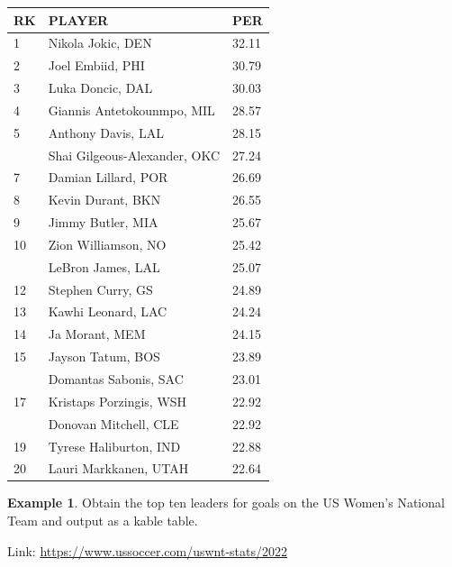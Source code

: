 \documentclass[
  11pt,
]{book}
\newenvironment{Shaded}{\begin{snugshade}}{\end{snugshade}}
\newcommand{\DecValTok}[1]{\textcolor[rgb]{0.00,0.00,0.81}{#1}}
\newcommand{\FunctionTok}[1]{\textcolor[rgb]{0.00,0.00,0.00}{#1}}
\newcommand{\NormalTok}[1]{#1}
\newcommand{\OtherTok}[1]{\textcolor[rgb]{0.56,0.35,0.01}{#1}}
\newcommand{\SpecialCharTok}[1]{\textcolor[rgb]{0.00,0.00,0.00}{#1}}
\newcommand{\StringTok}[1]{\textcolor[rgb]{0.31,0.60,0.02}{#1}}
\theoremstyle{definition}
\theoremstyle{definition}
\newtheorem{example}{Example}[chapter]
\theoremstyle{definition}
\theoremstyle{definition}
\theoremstyle{remark}
\begin{document}
\begin{tabular}{lll}
\toprule
RK & PLAYER & PER\\
\midrule
1 & Nikola Jokic, DEN & 32.11\\
2 & Joel Embiid, PHI & 30.79\\
3 & Luka Doncic, DAL & 30.03\\
4 & Giannis Antetokounmpo, MIL & 28.57\\
5 & Anthony Davis, LAL & 28.15\\
\addlinespace
6 & Shai Gilgeous-Alexander, OKC & 27.24\\
7 & Damian Lillard, POR & 26.69\\
8 & Kevin Durant, BKN & 26.55\\
9 & Jimmy Butler, MIA & 25.67\\
10 & Zion Williamson, NO & 25.42\\
\addlinespace
11 & LeBron James, LAL & 25.07\\
12 & Stephen Curry, GS & 24.89\\
13 & Kawhi Leonard, LAC & 24.24\\
14 & Ja Morant, MEM & 24.15\\
15 & Jayson Tatum, BOS & 23.89\\
\addlinespace
16 & Domantas Sabonis, SAC & 23.01\\
17 & Kristaps Porzingis, WSH & 22.92\\
 & Donovan Mitchell, CLE & 22.92\\
19 & Tyrese Haliburton, IND & 22.88\\
20 & Lauri Markkanen, UTAH & 22.64\\
\bottomrule
\end{tabular}

\newpage

\begin{example}
Obtain the top ten leaders for goals on the US Women's National Team and output as a kable table.

Link: \url{https://www.ussoccer.com/uswnt-stats/2022}
\end{example}

\begin{Shaded}
\end{Shaded}
\end{document}
